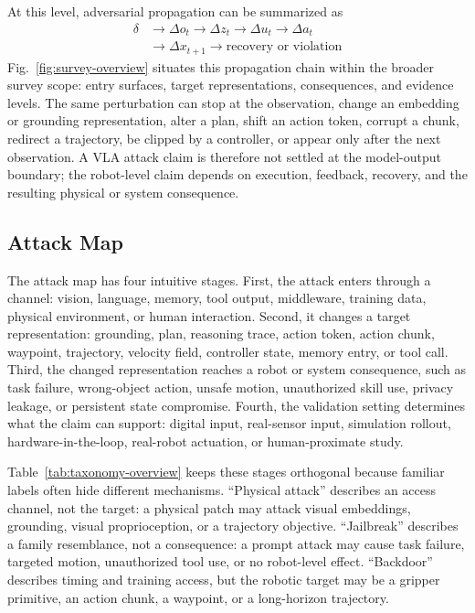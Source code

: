 At this level, adversarial propagation can be summarized as
\begin{align}
\delta &\rightarrow \Delta o_t \rightarrow \Delta z_t
\rightarrow \Delta u_t \rightarrow \Delta a_t \nonumber\\
&\rightarrow \Delta x_{t+1}
\rightarrow \text{recovery or violation}
\label{eq:attack-propagation}
\end{align}
Fig.~\ref{fig:survey-overview} situates this propagation chain within the broader survey scope: entry surfaces, target representations, consequences, and evidence levels. The same perturbation can stop at the observation, change an embedding or grounding representation, alter a plan, shift an action token, corrupt a chunk, redirect a trajectory, be clipped by a controller, or appear only after the next observation. A VLA attack claim is therefore not settled at the model-output boundary; the robot-level claim depends on execution, feedback, recovery, and the resulting physical or system consequence.

\subsection{Attack Map}

The attack map has four intuitive stages. First, the attack enters through a channel: vision, language, memory, tool output, middleware, training data, physical environment, or human interaction. Second, it changes a target representation: grounding, plan, reasoning trace, action token, action chunk, waypoint, trajectory, velocity field, controller state, memory entry, or tool call. Third, the changed representation reaches a robot or system consequence, such as task failure, wrong-object action, unsafe motion, unauthorized skill use, privacy leakage, or persistent state compromise. Fourth, the validation setting determines what the claim can support: digital input, real-sensor input, simulation rollout, hardware-in-the-loop, real-robot actuation, or human-proximate study.

Table~\ref{tab:taxonomy-overview} keeps these stages orthogonal because familiar labels often hide different mechanisms. ``Physical attack'' describes an access channel, not the target: a physical patch may attack visual embeddings, grounding, visual proprioception, or a trajectory objective. ``Jailbreak'' describes a family resemblance, not a consequence: a prompt attack may cause task failure, targeted motion, unauthorized tool use, or no robot-level effect. ``Backdoor'' describes timing and training access, but the robotic target may be a gripper primitive, an action chunk, a waypoint, or a long-horizon trajectory.

